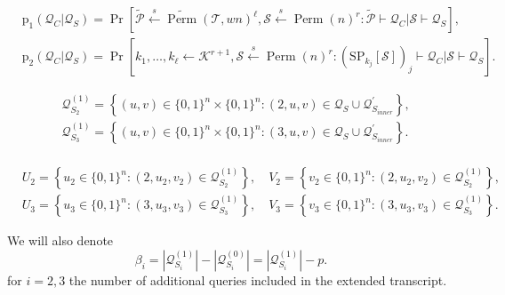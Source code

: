 $$
\begin{aligned}
&\mathrm{p}_{1}\left(\mathcal{Q}_{C} | \mathcal{Q}_{S}\right)=\operatorname{Pr}\left[\widetilde{\mathcal{P}} \stackrel{s}{\leftarrow} \widetilde{\operatorname{Perm}}(\mathcal{T}, w n)^{\ell}, \mathcal{S} \stackrel{s}{\leftarrow} \operatorname{Perm}(n)^{r}: \tilde{\mathcal{P}} \vdash \mathcal{Q}_{C} | \mathcal{S} \vdash \mathcal{Q}_{S}\right],\\
&\mathrm{p}_{2}\left(\mathcal{Q}_{C} | \mathcal{Q}_{S}\right)=\operatorname{Pr}\left[k_{1}, \ldots, k_{\ell} \leftarrow \mathcal{K}^{r+1}, \mathcal{S} \stackrel{s}{\leftarrow} \operatorname{Perm}(n)^{r}:\left(\mathrm{SP}_{k_{j}}[\mathcal{S}]\right)_{j} \vdash \mathcal{Q}_{C} | \mathcal{S} \vdash \mathcal{Q}_{S}\right].
\end{aligned}
$$

$$
\begin{aligned}
&\mathcal{Q}_{S_{2}}^{(1)}=\left\{(u, v) \in\{0,1\}^{n} \times\{0,1\}^{n}:(2, u, v) \in \mathcal{Q}_{S} \cup \mathcal{Q}_{S_{inner}}^{\prime}\right\},\\
&\mathcal{Q}_{S_{3}}^{(1)}=\left\{(u, v) \in\{0,1\}^{n} \times\{0,1\}^{n}:(3, u, v) \in \mathcal{Q}_{S} \cup \mathcal{Q}_{S_{inner}}^{\prime}\right\}.\\
\end{aligned}
$$

$$
\begin{aligned}
&U_{2}=\left\{u_{2} \in\{0,1\}^{n}:\left(2, u_{2}, v_{2}\right) \in \mathcal{Q}_{S_{2}}^{(1)}\right\}, \quad V_{2}=\left\{v_{2} \in\{0,1\}^{n}:\left(2, u_{2}, v_{2}\right) \in \mathcal{Q}_{S_{2}}^{(1)}\right\},\\
&U_{3}=\left\{u_{3} \in\{0,1\}^{n}:\left(3, u_{3}, v_{3}\right) \in \mathcal{Q}_{S_{3}}^{(1)}\right\}, \quad V_{3}=\left\{v_{3} \in\{0,1\}^{n}:\left(3, u_{3}, v_{3}\right) \in \mathcal{Q}_{S_{3}}^{(1)}\right\}.
\end{aligned}
$$

We will also denote
%
$$
\beta_{i}=\left|\mathcal{Q}_{S_{i}}^{(1)}\right|-\left|\mathcal{Q}_{S_{i}}^{(0)}\right|=\left|\mathcal{Q}_{S_{i}}^{(1)}\right|-p.
$$
%
for $i=2, 3$ the number of additional queries included in the extended transcript.


